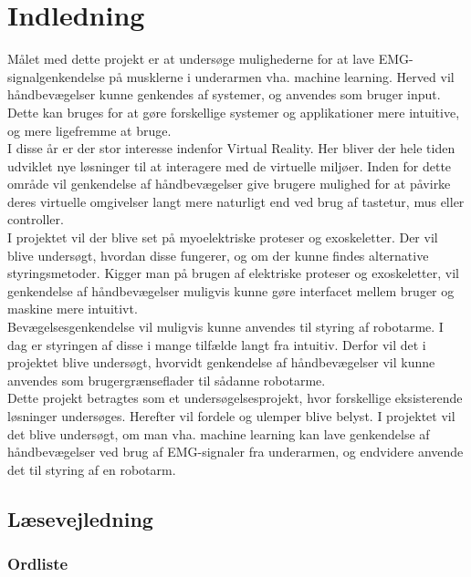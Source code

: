 \thispagestyle{fancy}
\chapter{Indledning}
\label{chp:indledning}
Målet med dette projekt er at undersøge mulighederne for at lave EMG-signalgenkendelse på musklerne i underarmen vha. machine learning. Herved vil håndbevægelser kunne genkendes af systemer, og anvendes som bruger input. Dette kan bruges for at gøre forskellige systemer og applikationer mere intuitive, og mere ligefremme at bruge.\\

I disse år er der stor interesse indenfor Virtual Reality. Her bliver der hele tiden udviklet nye løsninger til at interagere med de virtuelle miljøer. Inden for dette område vil genkendelse af håndbevægelser give brugere mulighed for at påvirke deres virtuelle omgivelser langt mere naturligt end ved brug af tastetur, mus eller controller.\\

I projektet vil der blive set på myoelektriske proteser og exoskeletter. Der vil blive undersøgt, hvordan disse fungerer, og om der kunne findes alternative styringsmetoder.
Kigger man på brugen af elektriske proteser og exoskeletter, vil genkendelse af håndbevægelser muligvis kunne gøre interfacet mellem bruger og maskine mere intuitivt.\\

Bevægelsesgenkendelse vil muligvis kunne anvendes til styring af robotarme. I dag er styringen af disse i mange tilfælde langt fra intuitiv. Derfor vil det i projektet blive undersøgt, hvorvidt genkendelse af håndbevægelser vil kunne anvendes som brugergrænseflader til sådanne robotarme. \\

Dette projekt betragtes som et undersøgelsesprojekt, hvor forskellige eksisterende løsninger undersøges. Herefter vil fordele og ulemper blive belyst. I projektet vil det blive undersøgt, om man vha. machine learning kan lave genkendelse af håndbevægelser ved brug af EMG-signaler fra underarmen, og endvidere anvende det til styring af en robotarm.

\vfill

\section{Læsevejledning}
\subsection*{Ordliste}

